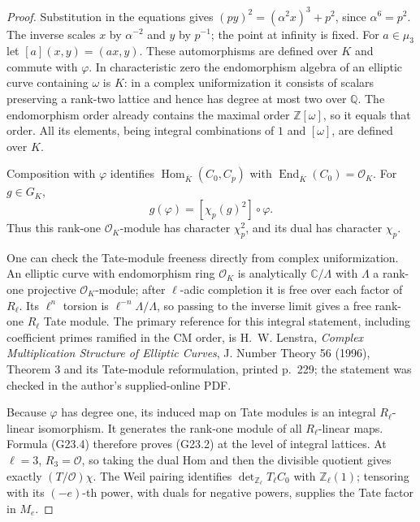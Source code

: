 \begin{proof}
Substitution in the equations gives
$(py)^2=(\alpha^2x)^3+p^2$, since $\alpha^6=p^2$.
The inverse scales $x$ by $\alpha^{-2}$ and $y$ by $p^{-1}$;
the point at infinity is fixed.  For $a\in\mu_3$ let
$[a](x,y)=(ax,y)$.  These automorphisms are defined over $K$ and
commute with $\varphi$.  In characteristic zero the endomorphism
algebra of an elliptic curve containing $\omega$ is $K$: in a
complex uniformization it consists of scalars preserving a
rank-two lattice and hence has degree at most two over $\mathbb Q$.
The endomorphism order already contains the maximal order
$\mathbb Z[\omega]$, so it equals that order.  All its elements,
being integral combinations of $1$ and $[\omega]$, are defined over
$K$.

Composition with $\varphi$ identifies
$\operatorname{Hom}_{\overline K}(C_0,C_p)$ with
$\operatorname{End}_{\overline K}(C_0)=\mathcal O_K$.
For $g\in G_K$,
\[
 g(\varphi)=[\chi_p(g)^2]\circ\varphi.                 \tag{G23.4}
\]
Thus this rank-one $\mathcal O_K$-module has character
$\chi_p^2$, and its dual has character $\chi_p$.

One can check the Tate-module freeness directly from complex
uniformization.  An elliptic curve with endomorphism ring
$\mathcal O_K$ is analytically $\mathbb C/\Lambda$ with
$\Lambda$ a rank-one projective $\mathcal O_K$-module; after
$\ell$-adic completion it is free over each factor of $R_\ell$.
Its $\ell^n$ torsion is $\ell^{-n}\Lambda/\Lambda$,
so passing to the inverse limit gives a free rank-one $R_\ell$
Tate module.  The primary reference for this integral statement,
including coefficient primes ramified in the CM order, is
H.~W. Lenstra, \emph{Complex Multiplication Structure of Elliptic
Curves}, J. Number Theory 56 (1996), Theorem 3 and its Tate-module
reformulation, printed p.~229; the statement was checked in the
author's supplied-online PDF.

Because $\varphi$ has degree one, its induced map on Tate modules is
an integral $R_\ell$-linear isomorphism.  It generates the rank-one
module of all $R_\ell$-linear maps.  Formula (G23.4) therefore proves
(G23.2) at the level of integral lattices.  At $\ell=3$,
$R_3=\mathcal O$, so taking the dual Hom and then the divisible
quotient gives exactly $(T/\mathcal O)\chi$.
The Weil pairing identifies
$\det_{\mathbb Z_\ell}T_\ell C_0$ with
$\mathbb Z_\ell(1)$; tensoring with its $(-e)$-th power, with
duals for negative powers, supplies the Tate factor in $M_e$.


\end{proof}
